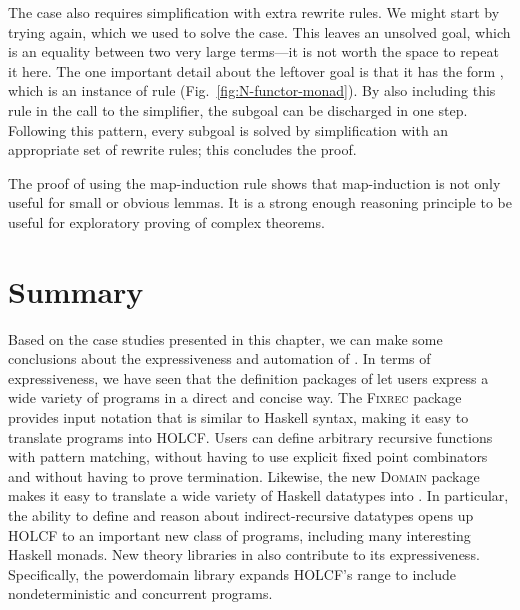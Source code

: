 The  case also requires simplification with extra rewrite rules. We might start by trying  again, which we used to solve the  case. This leaves an unsolved goal, which is an equality between two very large terms---it is not worth the space to repeat it here. The one important detail about the leftover goal is that it has the form , which is an instance of rule  (Fig.~\ref{fig:N-functor-monad}). By also including this rule in the call to the simplifier, the subgoal can be discharged in one step. Following this pattern, every subgoal is solved by simplification with an appropriate set of rewrite rules; this concludes the proof.

The proof of  using the map-induction rule  shows that map-induction is not only useful for small or obvious lemmas. It is a strong enough reasoning principle to be useful for exploratory proving of complex theorems.

\section{Summary}
\label{sec:case-summary}

Based on the case studies presented in this chapter, we can make some conclusions about the expressiveness and automation of . In terms of expressiveness, we have seen that the definition packages of  let users express a wide variety of programs in a direct and concise way. The \textsc{Fixrec} package provides input notation that is similar to Haskell syntax, making it easy to translate programs into HOLCF. Users can define arbitrary recursive functions with pattern matching, without having to use explicit fixed point combinators and without having to prove termination. Likewise, the new \textsc{Domain} package makes it easy to translate a wide variety of Haskell datatypes into . In particular, the ability to define and reason about indirect-recursive datatypes opens up HOLCF to an important new class of programs, including many interesting Haskell monads. New theory libraries in  also contribute to its expressiveness. Specifically, the powerdomain library expands HOLCF's range to include nondeterministic and concurrent programs.

